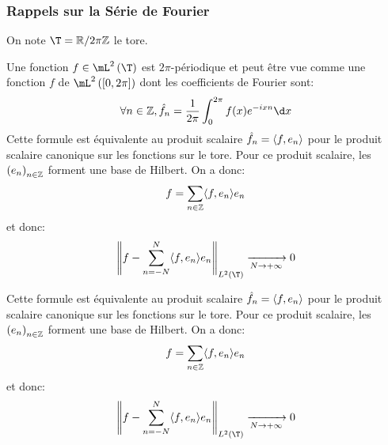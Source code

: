 \documentclass{cours}
\begin{document}
\subsubsection{Rappels sur la Série de Fourier}
On note $\T = \R/2\pi\Z$ le tore.
\begin{definition}
Une fonction $f \in \mL^{2}\left(\T\right)$ est $2\pi$-périodique et peut être vue comme une fonction $f$ de $\mL^{2}\left(\left[0, 2\pi\right]\right)$ dont les coefficients de Fourier sont:
\begin{equation*}
	\forall n\in \Z, \hat{f}_{n} = \frac{1}{2\pi}\int_{0}^{2\pi}f(x)e^{-ixn}\d x
\end{equation*}
Cette formule est équivalente au produit scalaire $\hat{f}_{n} = \langle f, e_{n} \rangle$ pour le produit scalaire canonique sur les fonctions sur le tore.
Pour ce produit scalaire, les $\left(e_{n}\right)_{n \in \mathbb{Z}}$ forment une base de Hilbert.
On a donc:
\begin{equation*}
	f = \sum_{n\in \mathbb{Z}}\langle f, e_{n} \rangle e_{n}
\end{equation*}
et donc:
\begin{equation*}
	\norm{f - \sum_{n = -N}^{N}\scalar{f, e_{n}}e_{n}}_{L^{2}\left(\T\right)} \xrightarrow[N \to +\infty]{}0
\end{equation*}
\end{definition}
\begin{proposition}
Cette formule est équivalente au produit scalaire $\hat{f}_{n} = \langle f, e_{n} \rangle$ pour le produit scalaire canonique sur les fonctions sur le tore.
Pour ce produit scalaire, les $\left(e_{n}\right)_{n \in \mathbb{Z}}$ forment une base de Hilbert.
On a donc:
\begin{equation*}
	f = \sum_{n\in \mathbb{Z}}\langle f, e_{n} \rangle e_{n}
\end{equation*}
et donc:
\begin{equation*}
	\norm{f - \sum_{n = -N}^{N}\scalar{f, e_{n}}e_{n}}_{L^{2}\left(\T\right)} \xrightarrow[N \to +\infty]{}0
\end{equation*}

	\label{prop:scalar_fourier_series}
\end{proposition}
\end{document}
